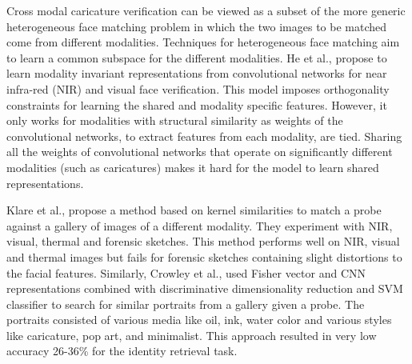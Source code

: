 Cross modal caricature verification can be viewed as a subset of the more generic heterogeneous face matching problem in which the two images to be matched come from different modalities. Techniques for heterogeneous face matching aim to learn a common subspace for the different modalities. He et al., \cite{AAAI_2017} propose to learn modality invariant representations from convolutional networks for near infra-red (NIR) and visual face verification. This model imposes orthogonality constraints for learning the shared and modality specific features. However, it only works for modalities with structural similarity as weights  of the convolutional networks, to extract features from each modality, are tied. Sharing all the weights of convolutional networks that operate on significantly different modalities (such as caricatures) makes it hard for the model to learn shared representations. 


Klare et al., \cite{hfrKlare} propose a method based on kernel similarities to match a probe against a gallery of images of a different modality. They experiment with NIR, visual, thermal and forensic sketches. This method performs well on NIR, visual and thermal images but fails for forensic sketches containing slight distortions to the facial features. Similarly, Crowley et al.,\cite{rw4} used Fisher vector and CNN representations combined with discriminative dimensionality reduction and SVM classifier to search for similar portraits from a gallery given a probe. The portraits consisted of various media like oil, ink, water color and various styles like caricature, pop art, and minimalist. This approach resulted in very low accuracy 26-36\% for the identity retrieval task. 


